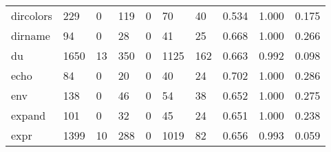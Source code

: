 \begin{longtable}{lp{2.0cm}p{2.0cm}p{2.0cm}p{2.0cm}p{2.0cm}p{2.0cm}p{2.0cm}p{2.0cm}p{2.0cm}}
dircolors &                    229 &                                  0 &                               119 &                                0 &                                70 &                              40 &                                0.534 &                                  1.000 &                                0.175 \\
dirname   &                     94 &                                  0 &                                28 &                                0 &                                41 &                              25 &                                0.668 &                                  1.000 &                                0.266 \\
du        &                   1650 &                                 13 &                               350 &                                0 &                              1125 &                             162 &                                0.663 &                                  0.992 &                                0.098 \\
echo      &                     84 &                                  0 &                                20 &                                0 &                                40 &                              24 &                                0.702 &                                  1.000 &                                0.286 \\
env       &                    138 &                                  0 &                                46 &                                0 &                                54 &                              38 &                                0.652 &                                  1.000 &                                0.275 \\
expand    &                    101 &                                  0 &                                32 &                                0 &                                45 &                              24 &                                0.651 &                                  1.000 &                                0.238 \\
expr      &                   1399 &                                 10 &                               288 &                                0 &                              1019 &                              82 &                                0.656 &                                  0.993 &                                0.059 \\

\end{longtable}

